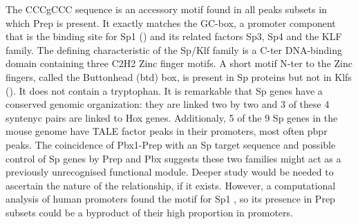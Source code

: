 
The CCCgCCC sequence is an accessory motif found in all peaks subsets in which Prep is present. It exactly matches the GC-box, a promoter component that is the binding site for Sp1 (\cite{Kriwacki1992}) and its related factors Sp3, Sp4 and the KLF family. The defining characteristic of the Sp/Klf family is a \ac{C-ter} DNA-binding domain containing three C2H2 Zinc finger motifs. A short motif \ac{N-ter} to the Zinc fingers, called the Buttonhead (btd) box, is present in Sp proteins but not in Klfs (\cite{Suske2005}). It does not contain a tryptophan. It is remarkable that Sp genes have a conserved genomic organization: they are linked two by two and 3 of these 4 syntenyc pairs are linked to Hox genes. Additionaly, 5 of the 9 Sp genes in the mouse genome have \ac{TALE} factor peaks in their promoters, most often \ac{pbpr} peaks. The coincidence of Pbx1-Prep with an Sp target sequence and possible control of Sp genes by Prep and Pbx suggests these two families might act as a previously unrecognised functional module. Deeper study would be needed to ascertain the nature of the relationship, if it exists. However, a computational analysis of human promoters found the motif for Sp1 \parencite{Hartmann2013}, so its presence in Prep subsets could be a byproduct of their high proportion in promoters.


